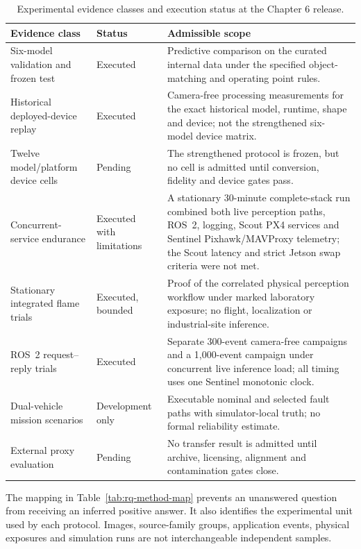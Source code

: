 \begin{table}[H]
  \centering
  \caption{Experimental evidence classes and execution status at the Chapter 6
  release.}
  \label{tab:methodology-status}
  \scriptsize
  \begin{tabularx}{\textwidth}{@{}p{}p{}X@{}}
    \toprule
    Evidence class & Status & Admissible scope \\
    \midrule
    Six-model validation and frozen test & Executed & Predictive comparison on
    the curated internal data under the specified object-matching and operating
    point rules. \\
    Historical deployed-device replay & Executed & Camera-free processing
    measurements for the exact historical model, runtime, shape and device;
    not the strengthened six-model device matrix. \\
    Twelve model/platform device cells & Pending & The strengthened protocol is
    frozen, but no cell is admitted until conversion, fidelity and device gates
    pass. \\
    Concurrent-service endurance & Executed with limitations & A stationary
    30-minute complete-stack run combined both live perception paths, ROS~2,
    logging, Scout PX4 services and Sentinel Pixhawk/MAVProxy telemetry; the
    Scout latency and strict Jetson swap criteria were not met. \\
    Stationary integrated flame trials & Executed, bounded & Proof of the
    correlated physical perception workflow under marked laboratory exposure;
    no flight, localization or industrial-site inference. \\
    ROS~2 request--reply trials & Executed & Separate 300-event camera-free
    campaigns and a 1,000-event campaign under concurrent live inference load;
    all timing uses one Sentinel monotonic clock. \\
    Dual-vehicle mission scenarios & Development only & Executable nominal and
    selected fault paths with simulator-local truth; no formal reliability
    estimate. \\
    External proxy evaluation & Pending & No transfer result is admitted until
    archive, licensing, alignment and contamination gates close. \\
    \bottomrule
  \end{tabularx}
\end{table}

The mapping in Table~\ref{tab:rq-method-map} prevents an unanswered question
from receiving an inferred positive answer. It also identifies the experimental
unit used by each protocol. Images, source-family groups, application events,
physical exposures and simulation runs are not interchangeable independent
samples.

